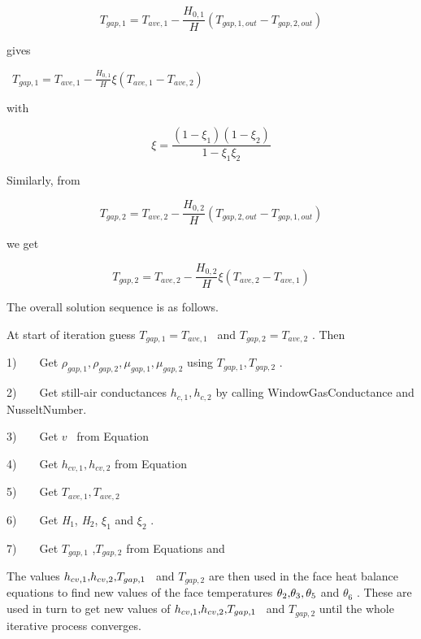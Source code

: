\begin{equation}
{T_{gap,1}} = {T_{ave,1}} - \frac{{{H_{0,1}}}}{H}\left( {{T_{gap,1,out}} - {T_{gap,2,out}}} \right)
\end{equation}

gives

~\({T_{gap,1}} = {T_{ave,1}} - \frac{{{H_{0,1}}}}{H}\xi \left( {{T_{ave,1}} - {T_{ave,2}}} \right)\)

with

\begin{equation}
\xi  = \frac{{(1 - {\xi_1})(1 - {\xi_2})}}{{1 - {\xi_1}{\xi_2}}}
\end{equation}

Similarly, from

\begin{equation}
{T_{gap,2}} = {T_{ave,2}} - \frac{{{H_{0,2}}}}{H}\left( {{T_{gap,2,out}} - {T_{gap,1,out}}} \right)
\end{equation}

we get

\begin{equation}
{T_{gap,2}} = {T_{ave,2}} - \frac{{{H_{0,2}}}}{H}\xi \left( {{T_{ave,2}} - {T_{ave,1}}} \right)
\end{equation}

The overall solution sequence is as follows.

At start of iteration guess \({T_{gap,1}} = {T_{ave,1}}\) ~and \({T_{gap,2}} = {T_{ave,2}}\) . Then

1)~~~~Get \({\rho_{gap,1}},{\rho_{gap,2}},{\mu_{gap,1}},{\mu_{gap,2}}\) using \({T_{gap,1}},{T_{gap,2}}\) .

2)~~~~Get still-air conductances \({h_{c,1}},{h_{c,2}}\) by calling WindowGasConductance and NusseltNumber.

3)~~~~Get \(v\) ~from Equation

4)~~~~Get \({h_{cv,1}},{h_{cv,2}}\) from Equation

5)~~~~Get \({T_{ave,1}},{T_{ave,2}}\)

6)~~~~Get \emph{H\(_{1}\)}, \emph{H\(_{2}\)}, \({\xi_1}\) and \({\xi_2}\) .

7)~~~~Get \({T_{gap,1}}\) ,\({T_{gap,2}}\) from Equations and

The values \({h_{cv,1}}{\rm{, }}{h_{cv,2}}{\rm{, }}{T_{gap,1}}\) ~and \({T_{gap,2}}\) are then used in the face heat balance equations to find new values of the face temperatures \({\theta_2}{\rm{, }}{\theta_3},{\rm{ }}{\theta_5}\) and \({\theta_6}\) . These are used in turn to get new values of \({h_{cv,1}}{\rm{, }}{h_{cv,2}}{\rm{, }}{T_{gap,1}}\) ~and \({T_{gap,2}}\) until the whole iterative process converges.


